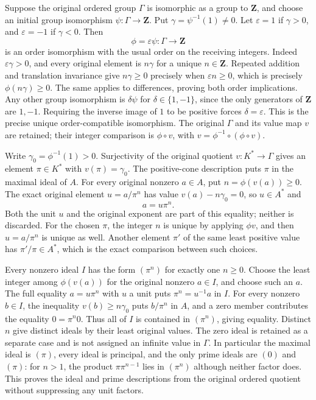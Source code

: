 \noindent
Suppose the original ordered group
$\Gamma$ is isomorphic as a group
to $\mathbf Z$, and choose an
initial group isomorphism
$\psi:\Gamma\to\mathbf Z$.
Put $\gamma=\psi^{-1}(1)\neq0$.
Let $\varepsilon=1$ if
$\gamma>0$, and $\varepsilon=-1$
if $\gamma<0$. Then
$$
\phi=\varepsilon\psi:\Gamma\longrightarrow\mathbf Z
$$
is an order isomorphism with
the usual order on the
receiving integers. Indeed
$\varepsilon\gamma>0$, and
every original element is
$n\gamma$ for a unique
$n\in\mathbf Z$. Repeated
addition and translation
invariance give
$n\gamma\geq0$ precisely when
$\varepsilon n\geq0$, which
is precisely $\phi(n\gamma)\geq0$.
The same applies to differences,
proving both order implications.
Any other group isomorphism
is $\delta\psi$ for
$\delta\in\{1,-1\}$, since
the only generators of
$\mathbf Z$ are $1,-1$.
Requiring the inverse image
of $1$ to be positive
forces $\delta=\varepsilon$.
This is the precise unique
order-compatible isomorphism.
The original $\Gamma$ and
its value map $v$ are
retained; their integer comparison
is $\phi\circ v$, with
$v=\phi^{-1}\circ(\phi\circ v)$.

Write $\gamma_0=\phi^{-1}(1)>0$.
Surjectivity of the original
quotient $v:K^*\to\Gamma$
gives an element $\pi\in K^*$
with $v(\pi)=\gamma_0$.
The positive-cone description
puts $\pi$ in the maximal
ideal of $A$. For every
original nonzero $a\in A$,
put $n=\phi(v(a))\geq0$.
The exact original element
$u=a/\pi^n$ has value
$v(a)-n\gamma_0=0$, so
$u\in A^*$ and
$$
a=u\pi^n.
$$
Both the unit $u$ and
the original exponent are
part of this equality;
neither is discarded. For
the chosen $\pi$, the
integer $n$ is unique by
applying $\phi v$, and
then $u=a/\pi^n$ is
unique as well. Another
element $\pi'$ of the
same least positive value
has $\pi'/\pi\in A^*$,
which is the exact comparison
between such choices.

Every nonzero ideal $I$
has the form $(\pi^n)$
for exactly one $n\geq0$.
Choose the least integer
among $\phi(v(a))$ for
the original nonzero $a\in I$,
and choose such an $a$.
The full equality $a=u\pi^n$
with $u$ a unit puts
$\pi^n=u^{-1}a$ in $I$.
For every nonzero $b\in I$,
the inequality $v(b)\geq n\gamma_0$
puts $b/\pi^n$ in $A$,
and a zero member contributes
the equality $0=\pi^n0$.
Thus all of $I$ is
contained in $(\pi^n)$,
giving equality. Distinct
$n$ give distinct ideals
by their least original
values. The zero ideal
is retained as a separate
case and is not assigned
an infinite value in $\Gamma$.
In particular the maximal
ideal is $(\pi)$, every
ideal is principal, and
the only prime ideals are
$(0)$ and $(\pi)$: for
$n>1$, the product
$\pi\pi^{n-1}$ lies in
$(\pi^n)$ although neither
factor does. This proves
the ideal and prime descriptions
from the original ordered
quotient without suppressing
any unit factors.

